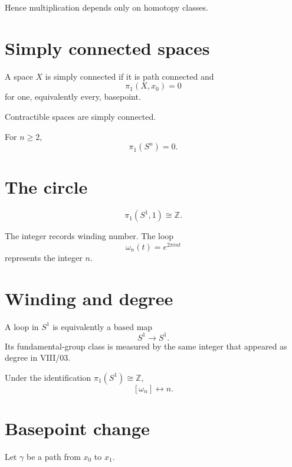 Hence multiplication depends only on homotopy classes.

\section{Simply connected spaces}

\begin{definition}
\label{def:viii09-simply-connected}
A space \(X\) is simply connected if it is path connected and
\[
\pi_1(X,x_0)=0
\]
for one, equivalently every, basepoint.
\end{definition}

Contractible spaces are simply connected.

\begin{example}
For \(n\ge2\),
\[
\pi_1(S^n)=0.
\]
\end{example}

\section{The circle}

\begin{theorem}
\label{thm:viii09-circle}
\[
\pi_1(S^1,1)\cong\mathbb Z.
\]
\end{theorem}

The integer records winding number.  The loop
\[
\omega_n(t)=e^{2\pi int}
\]
represents the integer \(n\).

\section{Winding and degree}

A loop in \(S^1\) is equivalently a based map
\[
S^1\to S^1.
\]
Its fundamental-group class is measured by the same integer that appeared as
degree in VIII/03.

\begin{proposition}
\label{prop:viii09-degree}
Under the identification \(\pi_1(S^1)\cong\mathbb Z\),
\[
[\omega_n]\longleftrightarrow n.
\]
\end{proposition}

\section{Basepoint change}

Let \(\gamma\) be a path from \(x_0\) to \(x_1\).

